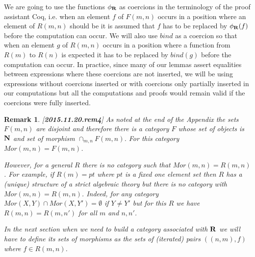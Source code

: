 \documentclass[11pt]{article}
\newtheorem{remark}[proposition]{Remark}
\newcommand{\llabel}[1]{\label{#1}[{\bf #1}]}
\newcommand{\nn}{{\bf N\rm}}
\newcommand{\rr}{{\bf R}}
\newcommand{\bind}{bind}
\begin{document}
We are going to use the functions $\phi_{\rr}$ as coercions in the terminology of the proof assistant Coq, i.e. when an element $f$ of $F(m,n)$ occurs in a position where an element of $R(m,n)$ should be it is assumed that $f$ has to be replaced by $\phi_{\rr}(f)$ before the computation can occur. We will also use $\bind$ as a coercion so that when an element $g$ of $R(m,n)$ occurs in a position where a function from $R(m)$ to $R(n)$ is expected it has to be replaced by $\bind(g)$ before the computation can occur. In practice, since many of our lemmas assert equalities between expressions where these coercions are not inserted, we will be using expressions without coercions inserted or with coercions only partially inserted in our computations but all the computations and proofs would remain valid if the coercions were fully inserted. 
%
\begin{comment}
%
\rm\llabel{2015.08.22.rem2}
We could also use the functions $\eta_n$ as coercions. This however would lead to an ambiguity of the following form. For $f\in R(m,n)$ and $i\in stn(m)$ we could read $f(i)$ both directly as the result of application of $f\in Fun(stn(m),R(n))$ to $i$ and as $\bind(f)(\eta_m(i))$. While the corresponding elements in $R(n)$ are equal they are equal because of the equality $\eta_m\circ \bind(f)=f$ from Definition \ref{2015.08.17.def1}. In the UniMath and other similar formalizations this equality is not a substitutional equality but only a transportational one and having the same expression to denote two objects that are not substitutionally equal is an ambiguity. See also Remark \ref{2015.08.30.rem3} below. 
%
\end{comment}
%
\begin{remark}\rm
\llabel{2015.11.20.rem4}
As noted at the end of the Appendix the sets $F(m,n)$ are disjoint and therefore there is a category $F$ whose set of objects is $\nn$ and set of morphism $\cap_{m,n}F(m,n)$. For this category $Mor(m,n)=F(m,n)$. 

However, for a general $R$ there is no category such that $Mor(m,n)=R(m,n)$. For example, if $R(m)=pt$ where $pt$ is a fixed one element set then $R$ has a (unique) structure of a strict algebraic theory but there is no category with  $Mor(m,n)=R(m,n)$. Indeed, for any category $Mor(X,Y)\cap Mor(X,Y')=\emptyset$ if $Y\ne Y'$ but for this $R$ we have $R(m,n)=R(m,n')$ for all $m$ and $n,n'$. 

In the next section when we need to build a category associated with $\rr$ we will have to define its sets of morphisms as the sets of (iterated) pairs $((n,m),f)$ where $f\in R(m,n)$. 
\end{remark}
\end{document}
